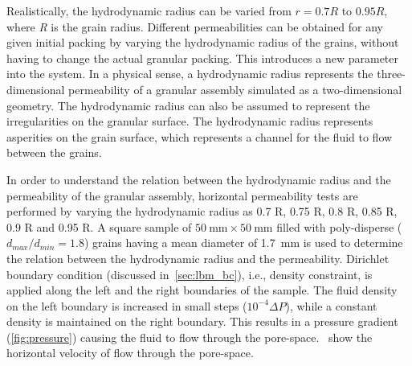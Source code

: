 Realistically, the hydrodynamic radius can be varied from $ r = 0.7 R$ to 
$0.95 R$, where \textit{R} is the grain radius. Different permeabilities can be 
obtained for any given initial packing by varying the hydrodynamic radius of 
the grains, without having to change the actual granular packing. This 
introduces a new parameter into the system. In a physical sense, a 
hydrodynamic radius represents the three-dimensional permeability of a 
granular assembly simulated as a two-dimensional geometry. The hydrodynamic 
radius can also be assumed to represent the irregularities on 
the granular surface. The hydrodynamic radius represents asperities on 
the grain surface, which represents a channel for the fluid to flow between the 
grains. 


In order to understand the relation between the hydrodynamic radius and the 
permeability of the granular assembly, horizontal permeability tests are 
performed by varying the hydrodynamic radius as 0.7 R, 0.75 R, 0.8 R, 0.85 R, 
0.9 R and 0.95 R. A square sample of $50~\si{\mm} \times 50~\si{\mm}$ filled 
with poly-disperse ($d_{max}/d_{min} = 1.8$) grains having a mean diameter of 
1.7~\si{\mm} is used to determine the relation between the hydrodynamic radius 
and the permeability. Dirichlet boundary condition (discussed 
in~\cref{sec:lbm_bc}), i.e., density constraint, is applied along the left and 
the right boundaries of the sample. The fluid density on the left boundary is 
increased in small steps ($10^{-4} \Delta P$), while a constant density is 
maintained on the right boundary. This results in a pressure gradient  
(\cref{fig:pressure}) causing the fluid to flow through the 
pore-space.~ show the horizontal velocity of flow through 
the pore-space.

